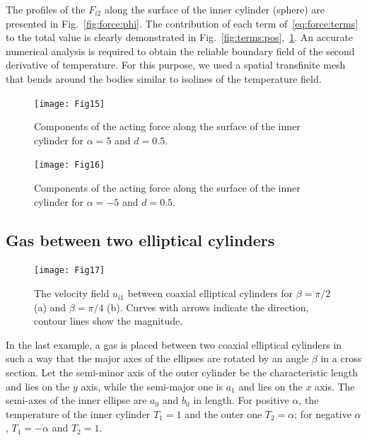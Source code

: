 \documentclass[smallextended, referee]{svjour3} %
\begin{document}
The profiles of the \(F_{i2}\) along the surface of the inner cylinder (sphere)
are presented in Fig.~\ref{fig:force:phi}.
The contribution of each term of~\eqref{eq:force:terms} to the total value is clearly demonstrated
in Fig.~\ref{fig:terms:pos},~\ref{fig:terms:neg}.
An accurate numerical analysis is required to obtain the reliable boundary field of
the second derivative of temperature.
For this purpose, we used a spatial transfinite mesh
that bends around the bodies similar to isolines of the temperature field.

\begin{figure}[ht]
    \centering
    \begin{minipage}{.48\textwidth}
        \centering
        \texttt{[image: Fig15]}
        \caption{Components of the acting force along the surface of
        	the inner cylinder for \(\alpha=5\) and \(d=0.5\).}
        \label{fig:terms:pos}
    \end{minipage}
    \quad
    \begin{minipage}{.48\textwidth}
        \centering
        \texttt{[image: Fig16]}
        \caption{Components of the acting force along the surface of
        	the inner cylinder for \(\alpha=-5\) and \(d=0.5\).}
        \label{fig:terms:neg}
    \end{minipage}
\end{figure}

\subsection{Gas between two elliptical cylinders}

\begin{figure}
    \centering
    \texttt{[image: Fig17]}
    \caption{The velocity field \(u_{i1}\) between coaxial elliptical cylinders
    	for \(\beta = \pi/2\) (a) and \(\beta = \pi/4\) (b).
        Curves with arrows indicate the direction, contour lines show the magnitude.
         }
    \label{fig:elliptic}
\end{figure}

In the last example, a gas is placed between two coaxial elliptical cylinders
in such a way that the major axes of the ellipses are rotated by an angle \(\beta\) in a cross section.
Let the semi-minor axis of the outer cylinder be the characteristic length and lies on the \(y\) axis,
while the semi-major one is \(a_1\) and lies on the \(x\) axis.
The semi-axes of the inner ellipse are \(a_0\) and \(b_0\) in length.
For positive \(\alpha\), the temperature of the inner cylinder \(T_1 = 1\) and the outer one \(T_2 = \alpha\);
for negative \(\alpha\), \(T_1 = -\alpha\) and \(T_2 = 1\).
\end{document}
